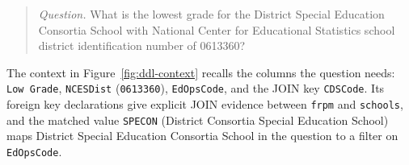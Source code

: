\begin{quote}
\textit{Question.} What is the lowest grade for the District Special Education Consortia
School with National Center for Educational Statistics school district identification
number of 0613360?
\end{quote}

The context in Figure~\ref{fig:ddl-context} recalls the columns the question needs:
\texttt{Low Grade}, \texttt{NCESDist} (\texttt{0613360}), \texttt{EdOpsCode}, and the
JOIN key \texttt{CDSCode}. Its foreign key declarations give explicit JOIN evidence
between \texttt{frpm} and \texttt{schools}, and the matched value
\texttt{\textquotesingle SPECON\textquotesingle} (District Consortia Special Education
School) maps District Special Education Consortia School in the question to a filter on
\texttt{EdOpsCode}.
